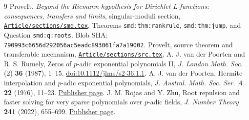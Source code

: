 \documentclass[11pt]{article}
\theoremstyle{remark}\newtheorem{remark}[theorem]{Remark}
\begin{document}
\begin{thebibliography}{9}
 ProveIt, \emph{Beyond the Riemann hypothesis for Dirichlet
L-functions: consequences, transfers and limits}, singular-moduli section,
\href{https://github.com/VladimirReshetnikov/ProveIt/blob/main/Analysis/GeneralizedRiemannHypothesis/Article/sections/smd.tex}{\texttt{Article/sections/smd.tex}},
Theorems \texttt{smd:thm:rankrule}, \texttt{smd:thm:jump}, and Question \texttt{smd:q:roots}.
Blob SHA: \texttt{790993c6656d292056ac5eadc893061fa7a19002}.
 ProveIt, source theorem and transferable mechanism,
\href{https://github.com/VladimirReshetnikov/ProveIt/blob/main/Analysis/GeneralizedRiemannHypothesis/Article/sections/src.tex}{\texttt{Article/sections/src.tex}}.
 A. J. van der Poorten and R. S. Rumely, Zeros of $p$-adic exponential
polynomials II, \emph{J. London Math. Soc.} (2) \textbf{36} (1987), 1--15.
\href{https://doi.org/10.1112/jlms/s2-36.1.1}{doi:10.1112/jlms/s2-36.1.1}.
 A. J. van der Poorten, Hermite interpolation and $p$-adic exponential
polynomials, \emph{J. Austral. Math. Soc. Ser. A} \textbf{22} (1976), 11--23.
\href{https://www.cambridge.org/core/journals/journal-of-the-australian-mathematical-society/article/hermite-interpolation-and-padic-exponential-polynomials/46C55A4B6B0E76934DBD8CECFA35749A}{Publisher page}.
 J. M. Rojas and Y. Zhu, Root repulsion and faster solving for very sparse
polynomials over $p$-adic fields, \emph{J. Number Theory} \textbf{241} (2022), 655--699.
\href{https://www.sciencedirect.com/science/article/abs/pii/S0022314X22000877}{Publisher page}.
\end{thebibliography}
\end{document}
